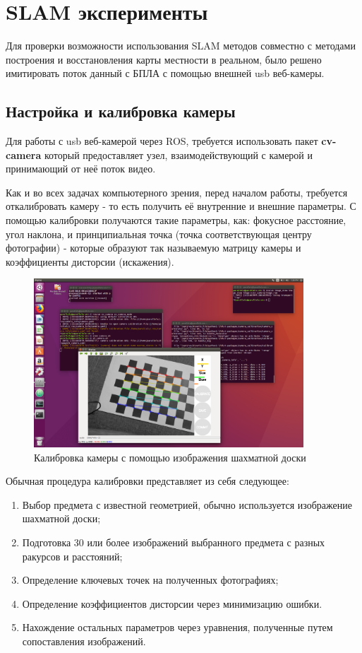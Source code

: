 \chapter{SLAM эксперименты}

Для проверки возможности использования SLAM методов совместно с методами построения и восстановления карты местности в реальном, было решено имитировать поток данный с БПЛА с помощью внешней usb веб-камеры.

\section{Настройка и калибровка камеры}

Для работы с usb веб-камерой через ROS, требуется использовать пакет \textbf{cv-camera} который предоставляет узел, взаимодействующий с камерой и принимающий от неё поток видео.

Как и во всех задачах компьютерного зрения, перед началом работы, требуется откалибровать камеру - то есть получить её внутренние и внешние параметры. С помощью калибровки получаются такие параметры, как: фокусное расстояние, угол наклона, и принципиальная точка (точка соответствующая центру фотографии) - которые образуют так называемую матрицу камеры и коэффициенты дисторсии (искажения).

\begin{figure}[h]
    \centering
    \includegraphics[width=0.9\textwidth]{images/chess.png}
    \caption{Калибровка камеры с помощью изображения шахматной доски}
    \label{fig:chess}
\end{figure}

Обычная процедура калибровки представляет из себя следующее:

\begin{enumerate}
    \item Выбор предмета с известной геометрией, обычно используется изображение шахматной доски;
    \item Подготовка 30 или более изображений выбранного предмета с разных ракурсов и расстояний;
    \item Определение ключевых точек на полученных фотографиях;
    \item Определение коэффициентов дисторсии через минимизацию ошибки.
    \item Нахождение остальных параметров через уравнения, полученные путем сопоставления изображений.
\end{enumerate}
 
